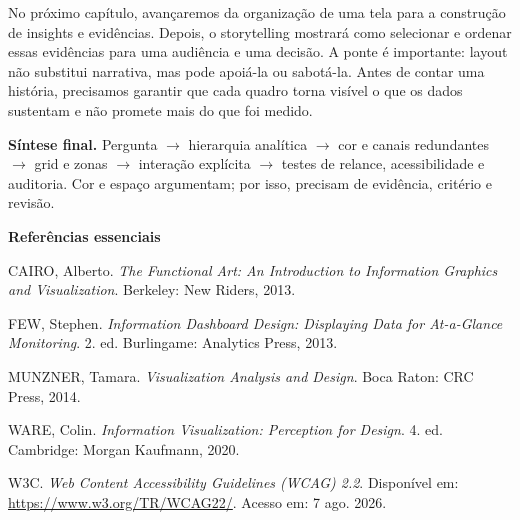 No próximo capítulo, avançaremos da organização de uma tela para a construção de insights e evidências. Depois, o storytelling mostrará como selecionar e ordenar essas evidências para uma audiência e uma decisão. A ponte é importante: layout não substitui narrativa, mas pode apoiá-la ou sabotá-la. Antes de contar uma história, precisamos garantir que cada quadro torna visível o que os dados sustentam e não promete mais do que foi medido.

\begin{SummaryBox}
\textbf{Síntese final.} Pergunta $\rightarrow$ hierarquia analítica $\rightarrow$ cor e canais redundantes $\rightarrow$ grid e zonas $\rightarrow$ interação explícita $\rightarrow$ testes de relance, acessibilidade e auditoria. Cor e espaço argumentam; por isso, precisam de evidência, critério e revisão.
\end{SummaryBox}

\bigskip
\noindent\textbf{Referências essenciais}

\begingroup\small

CAIRO, Alberto. \textit{The Functional Art: An Introduction to Information Graphics and Visualization}. Berkeley: New Riders, 2013.

FEW, Stephen. \textit{Information Dashboard Design: Displaying Data for At-a-Glance Monitoring}. 2. ed. Burlingame: Analytics Press, 2013.

MUNZNER, Tamara. \textit{Visualization Analysis and Design}. Boca Raton: CRC Press, 2014.

WARE, Colin. \textit{Information Visualization: Perception for Design}. 4. ed. Cambridge: Morgan Kaufmann, 2020.

W3C. \textit{Web Content Accessibility Guidelines (WCAG) 2.2}. Disponível em: \url{https://www.w3.org/TR/WCAG22/}. Acesso em: 7 ago. 2026.
\endgroup
